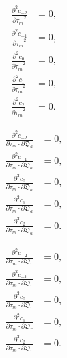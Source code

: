 \documentclass[a4paper,11pt,twoside,openright]{book}
\def\lthtmlcheckvsize{\ifdim\ht\sizebox<\vsize 
  \ifdim\wd\sizebox<\hsize\expandafter\hfill\fi \expandafter\vfill
  \else\expandafter\vss\fi}%
\begin{document}
{\newpage\clearpage
\setcounter{equation}{129}
%
\begin{subequations}\begin{align}
\frac{\partial^2 c_{-2}}{{\partial \tau_m}^2}  &=  0, \\
\frac{\partial^2 c_{-1}}{{\partial \tau_m}^2} &= 0, \\
\frac{\partial^2 c_{0}}{{\partial \tau_m}^2}  &= 0, \\
\frac{\partial^2 c_{1}}{{\partial \tau_m}^2}  &= 0, \\
\frac{\partial^2 c_{2}}{{\partial \tau_m}^2}  &= 0.
\end{align}\end{subequations}%
\lthtmldisplayZ
\lthtmlcheckvsize\clearpage}

{\newpage\clearpage
\setcounter{equation}{130}
%
\begin{subequations}\begin{align}
\frac{\partial^2 c_{-2}}{\partial \tau_m \cdot \partial \mathfrak{D}_a}  &=  0, \\
\frac{\partial^2 c_{-1}}{\partial \tau_m \cdot \partial \mathfrak{D}_a} &= 0, \\
\frac{\partial^2 c_{0}}{\partial \tau_m \cdot \partial \mathfrak{D}_a}  &= 0, \\
\frac{\partial^2 c_{1}}{\partial \tau_m \cdot \partial \mathfrak{D}_a}  &= 0, \\
\frac{\partial^2 c_{2}}{\partial \tau_m \cdot \partial \mathfrak{D}_a}  &= 0.
\end{align}\end{subequations}%
\lthtmldisplayZ
\lthtmlcheckvsize\clearpage}

{\newpage\clearpage
\setcounter{equation}{131}
%
\begin{subequations}\begin{align}
\frac{\partial^2 c_{-2}}{\partial \tau_m \cdot \partial \mathfrak{D}_r}  &=  0, \\
\frac{\partial^2 c_{-1}}{\partial \tau_m \cdot \partial \mathfrak{D}_r} &= 0, \\
\frac{\partial^2 c_{0}}{\partial \tau_m \cdot \partial \mathfrak{D}_r}  &= 0, \\
\frac{\partial^2 c_{1}}{\partial \tau_m \cdot \partial \mathfrak{D}_r}  &= 0, \\
\frac{\partial^2 c_{2}}{\partial \tau_m \cdot \partial \mathfrak{D}_r}  &= 0.
\end{align}\end{subequations}%
\lthtmldisplayZ
\lthtmlcheckvsize\clearpage}
\end{document}
